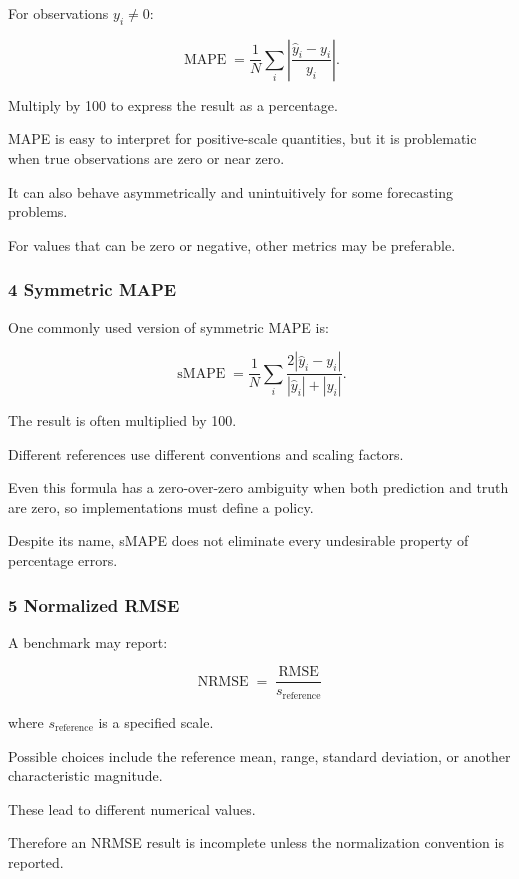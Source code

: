 For observations \(y_i\ne0\):

\[
 \boxed{ \operatorname{MAPE} = \frac1N \sum_i \left| \frac{\hat y_i-y_i}{y_i} \right| }.
\]

Multiply by 100 to express the result as a percentage.

MAPE is easy to interpret for positive-scale quantities, but it is problematic when true observations are zero or near zero.

It can also behave asymmetrically and unintuitively for some forecasting problems.

For values that can be zero or negative, other metrics may be preferable.

\subsubsection{4 Symmetric MAPE}\label{02-foundations-ii-ch030-symmetric-mape}

One commonly used version of symmetric MAPE is:

\[
 \boxed{ \operatorname{sMAPE} = \frac1N\sum_i \frac{2|\hat y_i-y_i|} {|\hat y_i|+|y_i|} }.
\]

The result is often multiplied by 100.

Different references use different conventions and scaling factors.

Even this formula has a zero-over-zero ambiguity when both prediction and truth are zero, so implementations must define a policy.

Despite its name, sMAPE does not eliminate every undesirable property of percentage errors.

\subsubsection{5 Normalized RMSE}\label{02-foundations-ii-ch030-normalized-rmse}

A benchmark may report:

\[
 \operatorname{NRMSE} = \frac{\operatorname{RMSE}}{s_{\mathrm{reference}}}
\]

where \(s_{\mathrm{reference}}\) is a specified scale.

Possible choices include the reference mean, range, standard deviation, or another characteristic magnitude.

These lead to different numerical values.

Therefore an NRMSE result is incomplete unless the normalization convention is reported.

